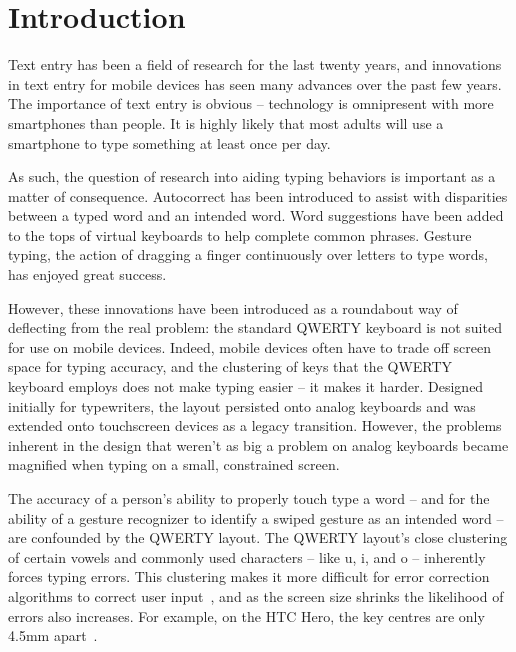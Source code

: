 \section{Introduction}

Text entry has been a field of research for the last twenty years, and innovations in text entry for mobile devices has seen many advances over the past few years. The importance of text entry is obvious -- technology is omnipresent with more smartphones than people. It is highly likely that most adults will use a smartphone to type something at least once per day. 

As such, the question of research into aiding typing behaviors is important as a matter of consequence. Autocorrect has been introduced to assist with disparities between a typed word and an intended word. Word suggestions have been added to the tops of virtual keyboards to help complete common phrases. Gesture typing, the action of dragging a finger continuously over letters to type words, has enjoyed great success. 

However, these innovations have been introduced as a roundabout way of deflecting from the real problem:  the standard QWERTY keyboard is not suited for use on mobile devices. Indeed, mobile devices often have to trade off screen space for typing accuracy, and the clustering of keys that the QWERTY keyboard employs does not make typing easier -- it makes it harder. Designed initially for typewriters, the layout persisted onto analog keyboards and was extended onto touchscreen devices as a legacy transition. However, the problems inherent in the design that weren't as big a problem on analog keyboards became magnified when typing on a small, constrained screen.

The accuracy of a person's ability to properly touch type a word -- and for the ability of a gesture recognizer to identify a swiped gesture as an intended word -- are confounded by the QWERTY layout. The QWERTY layout's close clustering of certain vowels and commonly used characters -- like u, i, and o -- inherently forces typing errors. This clustering makes it more difficult for error correction algorithms to correct user input~\cite{ Dunlop:2012:MPO:2207676.2208659}, and as the screen size shrinks the likelihood of errors also increases. For example, on the HTC Hero, the key centres are only 4.5mm apart~\cite{ Dunlop:2012:MPO:2207676.2208659}. 

